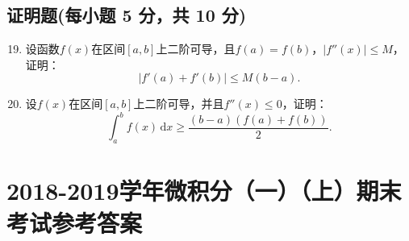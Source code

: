 \documentclass[../main.tex]{subfiles}
\begin{document}
\section{证明题(每小题 5 分，共 10 分)}
\begin{enumerate}
    \setcounter{enumi}{18}
    \item 设函数$f(x)$在区间$[a,b]$上二阶可导，且$f(a)=f(b)$，$|f''(x)|\leq M$，证明：
          \[
              |f'(a)+f'(b)|\leq M(b-a).
          \]
          \vspace{15em}

    \item 设$f(x)$在区间$[a,b]$上二阶可导，并且$f''(x)\leq 0$，证明：
          \[
              \int_{a}^{b}f(x)\,\mathrm{d}x \geq \frac{(b-a)(f(a)+f(b))}{2}.
          \]
          \vspace{15em}
\end{enumerate}

\chapter{2018-2019学年微积分（一）（上）期末考试参考答案}
\end{document}
